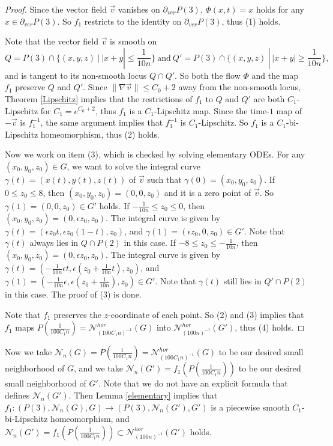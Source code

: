 \documentclass{amsart}
\begin{document}
\begin{proof}
Since the vector field $\vec{v}$ vanishes on $\partial_{ver}P(3)$, $\Phi(x,t)=x$ holds for any $x\in \partial_{ver}P(3)$. So $f_1$ restricts to the identity on $\partial_{ver}P(3)$, thus (1) holds.

Note that the vector field $\vec{v}$ is smooth on 
$$Q=P(3)\cap \{(x,y,z)\ |\ |x+y|\leq \frac{1}{10n}\}\ \text{and}\ Q'=P(3)\cap \{(x,y,z)\ |\ |x+y|\geq \frac{1}{10n}\},$$ 
and is tangent to its non-smooth locus $Q\cap Q'$. So both the flow $\Phi$ and the map $f_1$ preserve $Q$ and $Q'$. Since $\|\nabla \vec{v}\|\leq C_0+2$ away from the non-smooth locus, Theorem \ref{Lipschitz} implies that the restrictions of $f_1$ to $Q$ and $Q'$ are both $C_1$-Lipschitz for $C_1=e^{C_0+2}$, thus $f_1$ is a $C_1$-Lipschitz map. Since the time-$1$ map of $-\vec{v}$ is $f_1^{-1}$, the same argument implies that $f_1^{-1}$ is $C_1$-Lipschitz. So $f_1$ is a $C_1$-bi-Lipschitz homeomorphism, thus (2) holds.

Now we work on item (3), which is checked by solving elementary ODEs.  For any $(x_0,y_0,z_0)\in G$, we want to solve the integral curve $\gamma(t)=(x(t),y(t),z(t))$ of $\vec{v}$ such that $\gamma(0)=(x_0,y_0,z_0)$. If $0\leq z_0\leq 8$, then $(x_0,y_0,z_0)=(0,0,z_0)$ and it is a zero point of $\vec{v}$. So $\gamma(1)=(0,0,z_0)\in G'$ holds. If $-\frac{1}{10n}\leq z_0\leq 0$, then $(x_0,y_0,z_0)=(0,\epsilon z_0,z_0)$. The integral curve is given by $\gamma(t)=(\epsilon z_0t,\epsilon z_0(1-t),z_0)$, and $\gamma(1)=(\epsilon z_0,0,z_0)\in G'$. Note that $\gamma(t)$ always lies in $Q\cap P(2)$ in this case. If $-8\leq z_0\leq -\frac{1}{10n}$, then $(x_0,y_0,z_0)=(0,\epsilon z_0,z_0)$. The integral curve is given by $\gamma(t)=(-\frac{1}{10n}\epsilon t,\epsilon (z_0+\frac{1}{10n}t),z_0)$, and $\gamma(1)=(-\frac{1}{10n}\epsilon,\epsilon (z_0+\frac{1}{10n}),z_0)\in G'$. Note that $\gamma(t)$ still lies in $Q'\cap P(2)$ in this case. The proof of (3) is done.

Note that $f_1$ preserves the $z$-coordinate of each point. So (2) and (3) implies that $f_1$ maps $P(\frac{1}{100C_1n})=\mathcal{N}^{hor}_{(100C_1n)^{-1}}(G)$ into $\mathcal{N}^{hor}_{(100n)^{-1}}(G')$, thus (4) holds.
\end{proof}


Now we take $\mathcal{N}_n(G)=P(\frac{1}{100C_1n})=\mathcal{N}^{hor}_{(100C_1n)^{-1}}(G)$ to be our desired small neighborhood of $G$, and
we take $\mathcal{N}_n(G')=f_1(P(\frac{1}{100C_1n}))$ to be our desired small neighborhood of $G'$. Note that we do not have an explicit formula that defines $\mathcal{N}_n(G')$. Then Lemma \ref{elementary} implies that $f_1:(P(3),\mathcal{N}_n(G),G)\to (P(3),\mathcal{N}_n(G'),G')$ is a piecewise smooth $C_1$-bi-Lipschitz homeomorphism, and $\mathcal{N}_n(G')=f_1(P(\frac{1}{100C_1n})) \subset \mathcal{N}^{hor}_{(100n)^{-1}}(G')$ holds.
\end{document}
